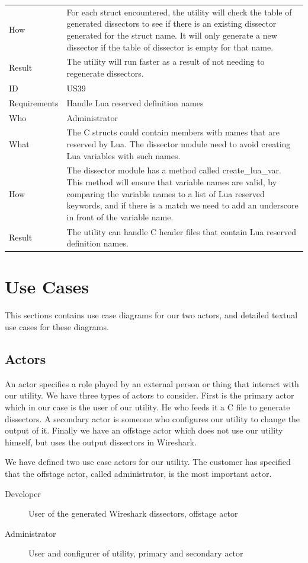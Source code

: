 \begin{table}[htbp]
{\begin{tabularx}{1.2\textwidth}{l X}
	How & For each struct encountered, the utility will check the table of generated dissectors to see if there is an existing dissector generated 			for the struct name. It will only generate a new dissector if the table of dissector is empty for that name. \\
	Result & The utility will run faster as a result of not needing to regenerate dissectors. \\
	\midrule
	ID & US39 \\
	Requirements & Handle Lua reserved definition names \\
	Who & Administrator \\
	What & The C structs could contain members with names that are reserved by Lua. The dissector module need to avoid creating Lua 				variables with such names.  \\
	How &	 The dissector module has a method called create\_lua\_var. This method will ensure that variable names are valid, by comparing the 			variable names to a list of Lua reserved keywords, and if there is a match we need to add an underscore in front of the variable name. \\ 
	Result & The utility can handle C header files that contain Lua reserved definition names. \\
	\bottomrule
\end{tabularx}}
\end{table}

\section{Use Cases}
\label{sec:req:usecases}
This sections contains use case diagrams for our two actors, and detailed
textual use cases for these diagrams.

\subsection{Actors}
An actor specifies a role played by an external person or thing that interact
with our utility. We have three types of actors to consider. First is the
primary actor which in our case is the user of our utility. He who feeds it a
C file to generate dissectors. A secondary actor is someone who configures our
utility to change the output of it. Finally we have an offstage actor which
does not use our utility himself, but uses the output dissectors in Wireshark.

We have defined two use case actors for our utility. The customer has specified
that the offstage actor, called administrator, is the most important actor.
\begin{description}
	\item[Developer] User of the generated Wireshark dissectors, offstage actor
	\item[Administrator] User and configurer of utility, primary and secondary actor
\end{description}

